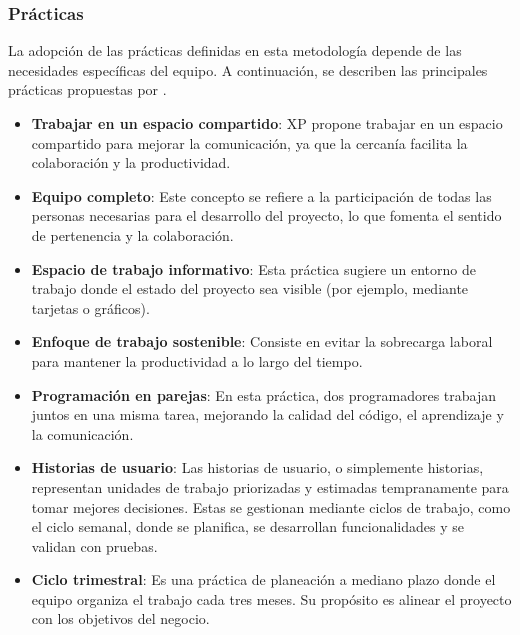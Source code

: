 \subsubsection{Prácticas}  La  adopción  de  las  prácticas  definidas  en  esta
metodología depende de las necesidades específicas del equipo.  A  continuación,
se describen las principales prácticas  propuestas  por  \parencite{beck2004xp}.
\begin{itemize}
      \item \textbf{Trabajar en un espacio compartido}: XP propone trabajar en
            un espacio compartido  para  mejorar  la  comunicación,  ya  que  la
            cercanía facilita la colaboración y la productividad.

      \item \textbf{Equipo completo}: Este concepto se refiere a la
            participación de todas las personas necesarias  para  el  desarrollo
            del proyecto,  lo  que  fomenta  el  sentido  de  pertenencia  y  la
            colaboración.

      \item \textbf{Espacio de trabajo informativo}: Esta práctica sugiere un
            entorno de trabajo donde el estado del  proyecto  sea  visible  (por
            ejemplo, mediante tarjetas o gráficos).

      \item \textbf{Enfoque de trabajo sostenible}: Consiste en evitar la
            sobrecarga laboral para mantener la productividad  a  lo  largo  del
            tiempo.

      \item \textbf{Programación en parejas}: En esta práctica, dos
            programadores trabajan juntos  en  una  misma  tarea,  mejorando  la
            calidad del código, el aprendizaje y la comunicación.

      \item \textbf{Historias de usuario}: Las historias de usuario, o
            simplemente historias, representan unidades de trabajo priorizadas y
            estimadas tempranamente para  tomar  mejores  decisiones.  Estas  se
            gestionan mediante ciclos de trabajo, como el ciclo  semanal,  donde
            se planifica,  se  desarrollan  funcionalidades  y  se  validan  con
            pruebas.

      \item \textbf{Ciclo trimestral}: Es una práctica de planeación a mediano
            plazo donde el equipo  organiza  el  trabajo  cada  tres  meses.  Su
            propósito es alinear el proyecto con los objetivos del negocio.


\end{itemize}
